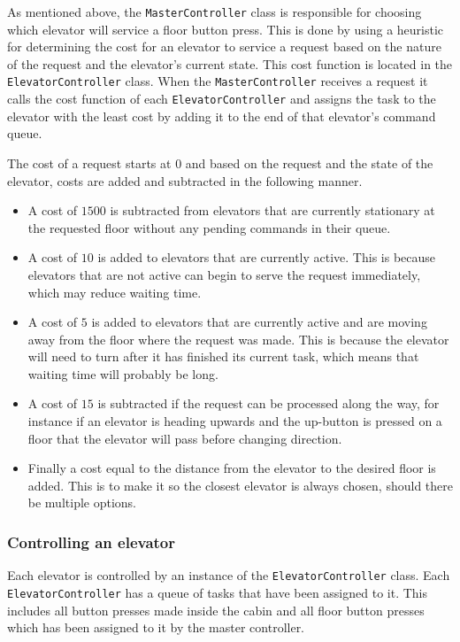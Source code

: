\documentclass[a4paper]{article}
\begin{document}
As mentioned above, the \texttt{MasterController} class is responsible for
choosing which elevator will service a floor button press. This is done by using
a heuristic for determining the cost for an elevator to service a request based
on the nature of the request and the elevator's current state. This cost
function is located in the \texttt{ElevatorController} class. When the
\texttt{MasterController} receives a request it calls the cost function of each
\texttt{ElevatorController} and assigns the task to the elevator with the least
cost by adding it to the end of that elevator's command queue.

The cost of a request starts at $0$ and based on the request and the state of
the elevator, costs are added and subtracted in the following manner.

\begin{itemize}
\item A cost of $1500$ is subtracted from elevators that are currently stationary
    at the requested floor without any pending commands in their queue.
\item A cost of $10$ is added to elevators that are currently active. This is
    because elevators that are not active can begin to serve the request
    immediately, which may reduce waiting time.
\item A cost of $5$ is added to elevators that are currently active and are
    moving away from the floor where the request was made. This is because the
    elevator will need to turn after it has finished its current task, which
    means that waiting time will probably be long.
\item A cost of $15$ is subtracted if the request can be processed along the
    way, for instance if an elevator is heading upwards and the up-button is
    pressed on a floor that the elevator will pass before changing direction.
\item Finally a cost equal to the distance from the elevator to the desired
    floor is added. This is to make it so the closest elevator is always chosen,
    should there be multiple options.
\end{itemize}

\subsubsection{Controlling an elevator}

Each elevator is controlled by an instance of the \texttt{ElevatorController}
class. Each \texttt{ElevatorController} has a queue of tasks that have been
assigned to it. This includes all button presses made inside the cabin and all
floor button presses which has been assigned to it by the master controller.
\end{document}
